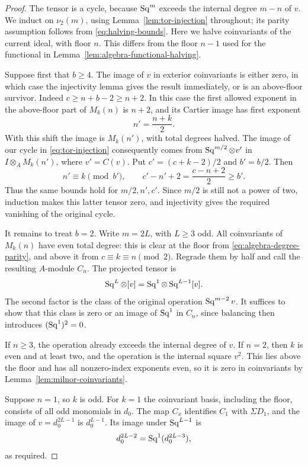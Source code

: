 \begin{proof}
The tensor is a cycle, because $\operatorname{Sq}^m$ exceeds the internal degree
$m-n$ of $v$.  We induct on $\nu_2(m)$, using
Lemma~\ref{lem:tor-injection} throughout; its parity assumption follows
from \eqref{eq:halving-bounds}. Here we halve coinvariants of the
current ideal, with floor $n$. This differs from the floor $n-1$
used for the functional in Lemma~\ref{lem:algebra-functional-halving}.

Suppose first that $b\geq4$.  The image of $v$ in exterior
coinvariants is either zero, in which case the injectivity lemma gives
the result immediately, or is an above-floor survivor.  Indeed
$c\geq n+b-2\geq n+2$.  In this case the first allowed exponent in
the above-floor part of $M_k(n)$ is $n+2$, and its Cartier image has
first exponent
\[
 n'=\frac{n+k}{2}.
\]
With this shift the image is $M_k(n')$, with total degrees halved.
The image of our cycle in \eqref{eq:tor-injection} consequently comes
from
$\operatorname{Sq}^{m/2}\otimes v'$ in $I\otimes_AM_k(n')$, where $v'=C(v)$.
Put $c'=(c+k-2)/2$ and $b'=b/2$.  Then
\[
 n'\equiv k\pmod{b'},\qquad
 c'-n'+2=\frac{c-n+2}{2}\geq b'.
\]
Thus the same bounds hold for $m/2,n',c'$.  Since $m/2$ is still
not a power of two, induction makes this latter tensor zero, and
injectivity gives the required vanishing of the original cycle.

It remains to treat $b=2$.  Write $m=2L$, with $L\geq3$ odd.
All coinvariants of $M_k(n)$ have even total degree: this is clear
at the floor from \eqref{eq:algebra-degree-parity}, and above it from
$c\equiv k\equiv n\pmod2$.  Regrade them by half and call the
resulting $A$-module $C_n$.  The projected tensor is
\[
 \operatorname{Sq}^L\otimes[v]
   =\operatorname{Sq}^1\otimes\operatorname{Sq}^{L-1}[v].
\]
The second factor is the class of the original operation
$\operatorname{Sq}^{m-2}v$.  It suffices to show that this class is zero or an
image of $\operatorname{Sq}^1$ in $C_n$, since balancing then introduces
$(\operatorname{Sq}^1)^2=0$.

If $n\geq3$, the operation already exceeds the internal degree of
$v$.  If $n=2$, then $k$ is even and at least two, and the operation
is the internal square $v^2$.  This lies above the floor and has all
nonzero-index exponents even, so it is zero in coinvariants by
Lemma~\ref{lem:milnor-coinvariants}.

Suppose $n=1$, so $k$ is odd.  For $k=1$ the coinvariant basis,
including the floor, consists of all odd monomials in $d_0$.
The map $C_x$ identifies $C_1$ with $\Sigma D_1$, and the image of
$v=d_0^{2L-1}$ is $d_0^{L-1}$.  Its image under $\operatorname{Sq}^{L-1}$ is
\[
 d_0^{2L-2}=\operatorname{Sq}^1(d_0^{2L-3}),
\]
as required.


\end{proof}
